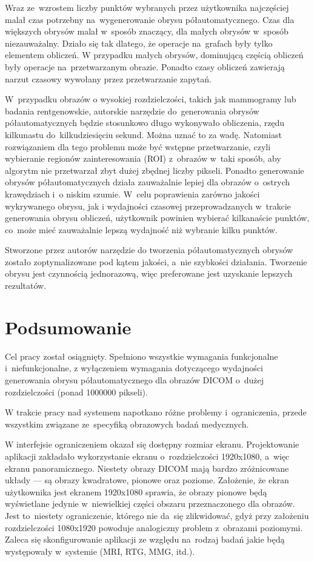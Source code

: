 \documentclass[a4paper,11pt,twoside,openright]{report}
\newcommand\blankpage{%
    \null
    \thispagestyle{empty}%
    \newpage}
\theoremstyle{definition}
\begin{document}
Wraz ze~wzrostem liczby punktów wybranych przez użytkownika najczęściej malał
czas potrzebny na~wygenerowanie obrysu półautomatycznego. Czas dla większych
obrysów malał w~sposób znaczący, dla małych obrysów w~sposób niezauważalny.
Działo się tak dlatego, że operacje na~grafach były tylko elementem obliczeń. W
przypadku małych obrysów, dominującą częścią obliczeń były operacje na~przetwarzanym
obrazie. Ponadto czasy obliczeń zawierają narzut czasowy wywołany przez
przetwarzanie zapytań.

W~przypadku obrazów o wysokiej rozdzielczości, takich jak mammogramy lub badania
rentgenowskie, autorskie narzędzie do~generowania obrysów półautomatycznych
będzie stosunkowo długo wykonywało obliczenia, rzędu kilkunastu do~kilkudziesięciu
sekund. Można uznać to za wadę. Natomiast rozwiązaniem dla tego problemu może być
wstępne przetwarzanie, czyli wybieranie regionów zainteresowania (ROI)
z~obrazów
w~taki sposób, aby algorytm nie przetwarzał zbyt dużej zbędnej liczby pikseli.
Ponadto generowanie obrysów
półautomatycznych działa zauważalnie lepiej dla obrazów o~ostrych krawędziach i~o
niskim szumie. W~celu poprawienia zarówno jakości wykrywanego obrysu, jak i
wydajności czasowej przeprowadzanych w~trakcie generowania obrysu obliczeń, użytkownik
powinien wybierać kilkanaście punktów, co~może mieć zauważalnie
lepszą wydajność niż wybranie kilku punktów.

Stworzone przez autorów narzędzie do tworzenia półautomatycznych obrysów zostało zoptymalizowane
pod kątem jakości, a~nie szybkości działania. Tworzenie obrysu jest czynnością jednorazową, więc
preferowane jest uzyskanie lepszych rezultatów.

\afterpage{\blankpage}
\chapter {Podsumowanie}


Cel pracy został osiągnięty. Spełniono wszystkie wymagania funkcjonalne i~niefunkcjonalne,
z wyłączeniem wymagania dotyczącego wydajności generowania obrysu półautomatycznego
dla obrazów DICOM o~dużej rozdzielczości (ponad 1000000 pikseli).

W trakcie pracy nad systemem napotkano różne problemy i~ograniczenia, przede wszystkim
związane ze~specyfiką obrazowych badań medycznych.

W interfejsie ograniczeniem okazał się dostępny rozmiar ekranu. Projektowanie
aplikacji zakładało wykorzystanie ekranu o~rozdzielczości 1920x1080, a~więc ekranu
panoramicznego. Niestety obrazy DICOM mają bardzo zróżnicowane układy --- są obrazy
kwadratowe, pionowe oraz poziome. Założenie, że ekran użytkownika jest ekranem
1920x1080 sprawia, że obrazy pionowe będą wyświetlane jedynie w~niewielkiej
części obszaru przeznaczonego dla obrazów. Jest to~niestety ograniczenie, którego
nie da~się zlikwidować, gdyż przy założeniu rozdzielczości 1080x1920 powoduje
analogiczny problem z~obrazami poziomymi. Zaleca się skonfigurowanie aplikacji
ze względu na~rodzaj badań jakie będą występowały w~systemie (MRI, RTG, MMG, itd.).
\end{document}
